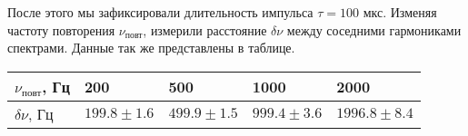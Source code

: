 \documentclass[a4paper,12pt]{article}
\begin{document}
После этого мы зафиксировали длительность импульса $\tau = 100$ мкс. Изменяя частоту повторения $\nu_{\text{повт}}$, измерили расстояние $\delta \nu$ между соседними гармониками спектрами. Данные так же представлены в таблице.

\begin{center}
\begin{tabular}{|l|l|l|l|l|}
\hline
$\nu_{\text{повт}}$, Гц     & 200    	      & 500    		& 1000    	  & 2000             \\ \hline
$\delta \nu$, Гц            & $199.8 \pm 1.6$ & $499.9 \pm 1.5$ & $999.4 \pm 3.6$ & $1996.8 \pm 8.4$ \\ \hline
\end{tabular}
\end{center}

\FloatBarrier

\begin{figure}[h]
    \centering
    \\
\end{figure}
\end{document}

